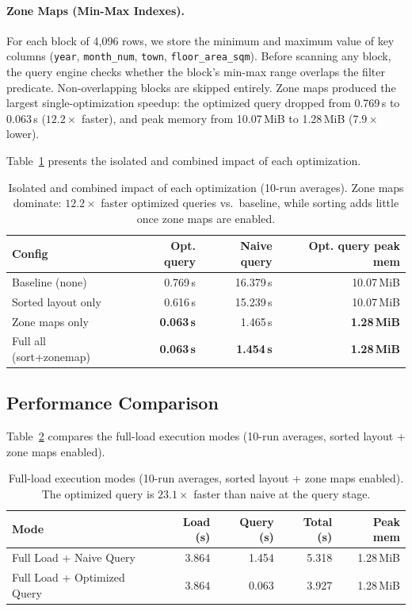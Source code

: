 \documentclass[11pt,a4paper]{article}
\begin{document}
\paragraph{Zone Maps (Min-Max Indexes).}
For each block of 4,096 rows, we store the minimum and maximum value of key columns (\texttt{year}, \texttt{month\_num}, \texttt{town}, \texttt{floor\_area\_sqm}). Before scanning any block, the query engine checks whether the block's min-max range overlaps the filter predicate. Non-overlapping blocks are skipped entirely. Zone maps produced the largest single-optimization speedup: the optimized query dropped from 0.769\,s to 0.063\,s ($\mathbf{12.2\times}$ faster), and peak memory from 10.07\,MiB to 1.28\,MiB ($\mathbf{7.9\times}$ lower).

Table~\ref{tab:optim} presents the isolated and combined impact of each optimization.

\begin{table}[H]
\centering
\small
\setlength{\tabcolsep}{4pt}
\begin{tabular}{l r r r}
\toprule
\textbf{Config} & \textbf{Opt. query} & \textbf{Naive query} & \textbf{Opt. query peak mem} \\
\midrule
Baseline (none)             & 0.769\,s & 16.379\,s & 10.07\,MiB \\
Sorted layout only          & 0.616\,s & 15.239\,s & 10.07\,MiB \\
Zone maps only              & \textbf{0.063\,s} & 1.465\,s & \textbf{1.28\,MiB} \\
Full all (sort+zonemap)     & \textbf{0.063\,s} & \textbf{1.454\,s} & \textbf{1.28\,MiB} \\
\bottomrule
\end{tabular}
\caption{Isolated and combined impact of each optimization (10-run averages). Zone maps dominate: $12.2\times$ faster optimized queries vs.\ baseline, while sorting adds little once zone maps are enabled.}
\label{tab:optim}
\end{table}

\subsection{Performance Comparison}

Table~\ref{tab:perf} compares the full-load execution modes (10-run averages, sorted layout + zone maps enabled).

\begin{table}[H]
\centering
\begin{tabular}{l r r r r}
\toprule
\textbf{Mode} & \textbf{Load (s)} & \textbf{Query (s)} & \textbf{Total (s)} & \textbf{Peak mem} \\
\midrule
Full Load + Naive Query     & 3.864 & 1.454 & 5.318 & 1.28\,MiB \\
Full Load + Optimized Query & 3.864 & 0.063 & 3.927 & 1.28\,MiB \\
\bottomrule
\end{tabular}
\caption{Full-load execution modes (10-run averages, sorted layout + zone maps enabled). The optimized query is $23.1\times$ faster than naive at the query stage.}
\label{tab:perf}
\end{table}
\end{document}
